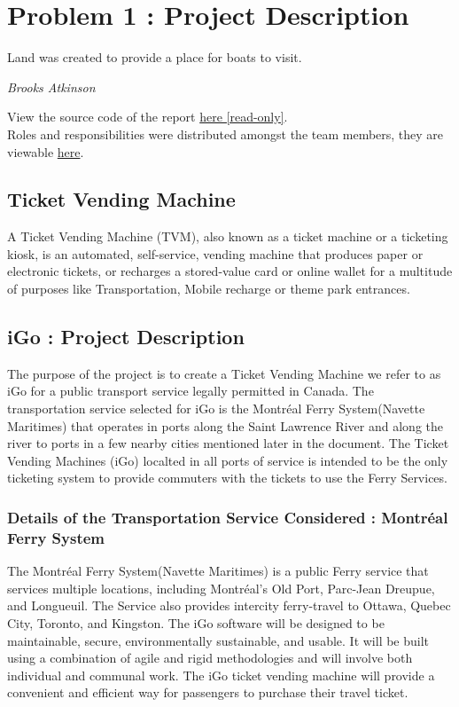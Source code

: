 \documentclass[letterpaper]{report}
\begin{document}
\chapter{Problem 1 : Project Description}
\epigraph{Land was created to provide a place for boats to visit. }{\textit{Brooks Atkinson}}
\vspace{\baselineskip}
View the source code of the report \href{https://www.overleaf.com/read/jdwsnqmxksty}{here [read-only]}.\\
Roles and responsibilities were distributed amongst the team members, they are viewable \href{https://docs.google.com/document/d/1j38J-lBybRq45DPbRcwjgABt5lwJG8n9n4gw6vJoOlY/}{here}.
\section{Ticket Vending Machine}

A Ticket Vending Machine (TVM), also known as a ticket machine or a ticketing kiosk, 
is an automated, self-service, vending machine that produces paper or electronic tickets, or recharges a stored-value card or online wallet for a multitude of purposes like Transportation, Mobile recharge or theme park entrances. 

\section{iGo : Project Description}
The purpose of the project is to create a Ticket Vending Machine we refer to as iGo for a public transport service legally permitted in Canada. The transportation service selected for iGo is the Montréal Ferry System(Navette Maritimes) that operates in ports along the Saint Lawrence River and along the river to ports in a few nearby cities mentioned later in the document. The Ticket Vending Machines (iGo) localted in all ports of service is intended to be the only ticketing system to provide commuters with the tickets to use the Ferry Services.

\subsection{Details of the Transportation Service Considered : Montréal Ferry System}
The Montréal Ferry System(Navette Maritimes) is a public Ferry service that services multiple locations, including Montréal's Old Port, Parc-Jean Dreupue, and Longueuil. The Service also provides intercity ferry-travel to Ottawa, Quebec City, Toronto, and Kingston. The iGo software will be designed to be maintainable, secure, environmentally sustainable, and usable. It will be built using a combination of agile and rigid methodologies and will involve both individual and communal work. The iGo ticket vending machine will provide a convenient and efficient way for passengers to purchase their travel ticket.
\end{document}
